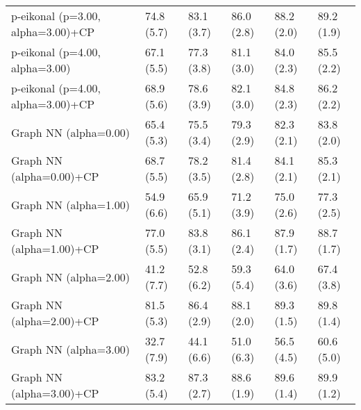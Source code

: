 \documentclass{article}
\begin{document}
\begin{table*}[t!]
\begin{center}
\begin{small}
\begin{sc}
\begin{tabular}{llllll}
p-eikonal (p=3.00, alpha=3.00)+CP&74.8 (5.7)      &83.1 (3.7)      &86.0 (2.8)      &88.2 (2.0)      &89.2 (1.9)      \\
p-eikonal (p=4.00, alpha=3.00)&67.1 (5.5)      &77.3 (3.8)      &81.1 (3.0)      &84.0 (2.3)      &85.5 (2.2)      \\
p-eikonal (p=4.00, alpha=3.00)+CP&68.9 (5.6)      &78.6 (3.9)      &82.1 (3.0)      &84.8 (2.3)      &86.2 (2.2)      \\
Graph NN (alpha=0.00)&65.4 (5.3)      &75.5 (3.4)      &79.3 (2.9)      &82.3 (2.1)      &83.8 (2.0)      \\
Graph NN (alpha=0.00)+CP&68.7 (5.5)      &78.2 (3.5)      &81.4 (2.8)      &84.1 (2.1)      &85.3 (2.1)      \\
Graph NN (alpha=1.00)&54.9 (6.6)      &65.9 (5.1)      &71.2 (3.9)      &75.0 (2.6)      &77.3 (2.5)      \\
Graph NN (alpha=1.00)+CP&77.0 (5.5)      &83.8 (3.1)      &86.1 (2.4)      &87.9 (1.7)      &88.7 (1.7)      \\
Graph NN (alpha=2.00)&41.2 (7.7)      &52.8 (6.2)      &59.3 (5.4)      &64.0 (3.6)      &67.4 (3.8)      \\
Graph NN (alpha=2.00)+CP&81.5 (5.3)      &86.4 (2.9)      &88.1 (2.0)      &89.3 (1.5)      &89.8 (1.4)      \\
Graph NN (alpha=3.00)&32.7 (7.9)      &44.1 (6.6)      &51.0 (6.3)      &56.5 (4.5)      &60.6 (5.0)      \\
Graph NN (alpha=3.00)+CP&83.2 (5.4)      &87.3 (2.7)      &88.6 (1.9)      &89.6 (1.4)      &89.9 (1.2)      \\
\bottomrule
\end{tabular}
\end{sc}
\end{small}
\end{center}
\vskip -0.1in
\end{table*}
\end{document}
